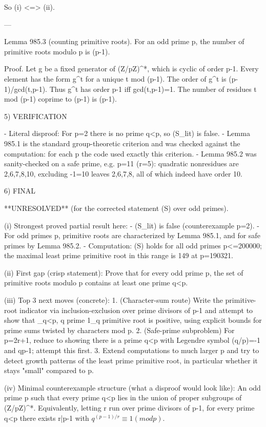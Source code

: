 So (i) <=> (ii).

---

Lemma 985.3 (counting primitive roots).
For an odd prime p, the number of primitive roots modulo p is \varphi(p-1).

Proof.
Let g be a fixed generator of (Z/pZ)^*, which is cyclic of order p-1. Every element has the
form g^t for a unique t mod (p-1). The order of g^t is (p-1)/gcd(t,p-1). Thus g^t has order
p-1 iff gcd(t,p-1)=1. The number of residues t mod (p-1) coprime to (p-1) is \varphi(p-1).

5) VERIFICATION

- Literal disproof: For p=2 there is no prime q<p, so (S_lit) is false.
- Lemma 985.1 is the standard group-theoretic criterion and was checked against the
  computation: for each p the code used exactly this criterion.
- Lemma 985.2 was sanity-checked on a safe prime, e.g. p=11 (r=5): quadratic nonresidues
  are {2,6,7,8,10}, excluding -1=10 leaves {2,6,7,8}, all of which indeed have order 10.

6) FINAL

**UNRESOLVED** (for the corrected statement (S) over odd primes).

(i) Strongest proved partial result here:
    - (S_lit) is false (counterexample p=2).
    - For odd primes p, primitive roots are characterized by Lemma 985.1, and for safe primes
      by Lemma 985.2.
    - Computation: (S) holds for all odd primes p<=200000; the maximal least prime primitive
      root in this range is 149 at p=190321.

(ii) First gap (crisp statement):
    Prove that for every odd prime p, the set of primitive roots modulo p contains at least
    one prime q<p.

(iii) Top 3 next moves (concrete):
    1. (Character-sum route) Write the primitive-root indicator via inclusion-exclusion over
       prime divisors of p-1 and attempt to show that \sum_{q<p, q prime} 1_{q primitive root}
       is positive, using explicit bounds for prime sums twisted by characters mod p.
    2. (Safe-prime subproblem) For p=2r+1, reduce to showing there is a prime q<p with
       Legendre symbol (q/p)=-1 and q\ne p-1; attempt this first.
    3. Extend computations to much larger p and try to detect growth patterns of the least
       prime primitive root, in particular whether it stays "small" compared to p.

(iv) Minimal counterexample structure (what a disproof would look like):
    An odd prime p such that every prime q<p lies in the union of proper subgroups of
    (Z/pZ)^*. Equivalently, letting r run over prime divisors of p-1,
      for every prime q<p there exists r|p-1 with \(q^{(p-1)/r} \equiv 1 (mod p)\).



